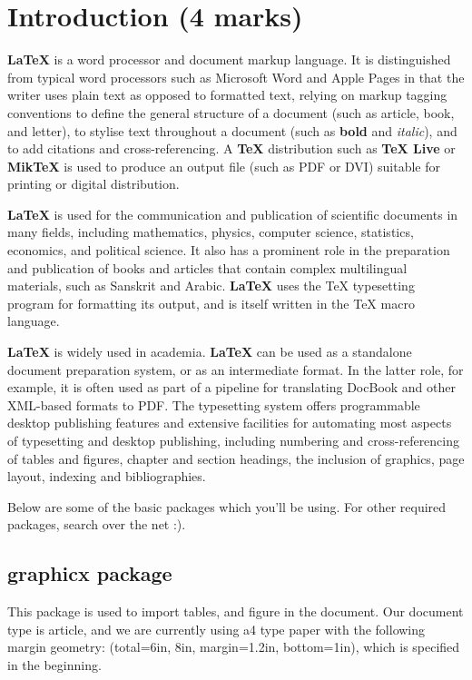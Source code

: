 \documentclass[english,12pt]{article}
\begin{document}
\section{Introduction (4 marks)}
\fontsize{12}{13.5}\selectfont
\textbf{\LaTeX{}} is a word processor and document markup language. It is distinguished
from typical word processors such as Microsoft Word and Apple Pages in that
the writer uses plain text as opposed to formatted text, relying on markup
tagging conventions to define the general structure of a document (such as
article, book, and letter), to stylise text throughout a document (such as \textbf{bold}
and \textit{italic}), and to add citations and cross-referencing. A \textbf{\TeX} distribution such
as \textbf{\TeX{} Live} or \textbf{MikTeX} is used to produce an output file (such as PDF or DVI)
suitable for printing or digital distribution.\\ \par
\textbf{\LaTeX{}} is used for the communication and publication of scientific documents
in many fields, including mathematics, physics, computer science, statistics,
economics, and political science. It also has a prominent role in the preparation
and publication of books and articles that contain complex multilingual materials, such as Sanskrit and Arabic. \textbf{\LaTeX{}} uses the TeX typesetting program for
formatting its output, and is itself written in the TeX macro language.\\ \par
\textbf{\LaTeX{}} is widely used in academia. \textbf{\LaTeX{}} can be used as a standalone document preparation system, or as an intermediate format. In the latter role, for
example, it is often used as part of a pipeline for translating DocBook and other
XML-based formats to PDF. The typesetting system offers programmable desktop publishing features and extensive facilities for automating most aspects of
typesetting and desktop publishing, including numbering and cross-referencing
of tables and figures, chapter and section headings, the inclusion of graphics,
page layout, indexing and bibliographies.\\ \par
Below are some of the basic packages which you’ll be using. For other
required packages, search over the net :).
\subsection{graphicx package}
This package is used to import tables, and figure in the document. Our
document type is article, and we are currently using a4 type paper with the
following margin geometry: (total={6in, 8in}, margin=1.2in, bottom=1in),
which is specified in the beginning.
\end{document}
